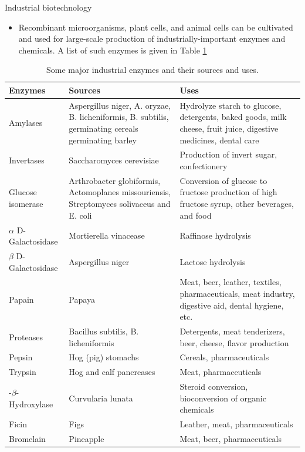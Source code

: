 \documentclass[ignorenonframetext,aspectratio=169]{beamer}
\providecommand{\tightlist}{%
  \setlength{\itemsep}{0pt}\setlength{\parskip}{0pt}}
\begin{document}
\begin{frame}{Industrial biotechnology}
\protect\hypertarget{industrial-biotechnology}{}

\begin{itemize}
\tightlist
\item
  Recombinant microorganisms, plant cells, and animal cells can be
  cultivated and used for large-scale production of
  industrially-important enzymes and chemicals. A list of such enzymes
  is given in Table \ref{tab:industrial-chemicals}
\end{itemize}

\begin{table}[t]

\caption{\label{tab:industrial-chemicals}Some major industrial enzymes and their sources and uses.}
\centering
\fontsize{5}{7}\selectfont
\begin{tabular}{>{\raggedright\arraybackslash}p{8em}>{\raggedright\arraybackslash}p{26em}>{\raggedright\arraybackslash}p{30em}}
\toprule
Enzymes & Sources & Uses\\
\midrule
\rowcolor{gray!6}  Amylases & Aspergillus niger, A. oryzae, B. licheniformis, B. subtilis, germinating cereals germinating barley & Hydrolyze starch to glucose, detergents, baked goods, milk cheese, fruit juice, digestive medicines, dental care\\
Invertases & Saccharomyces cerevisiae & Production of invert sugar, confectionery\\
\rowcolor{gray!6}  Glucose isomerase & Arthrobacter globiformis, Actomoplanes missouriensis, Streptomyces solivaceus and E. coli & Conversion of glucose to fructose production of high fructose syrup, other beverages, and food\\
$\alpha$ D-Galactosidase & Mortierella vinacease & Raffinose hydrolysis\\
\rowcolor{gray!6}  $\beta$ D-Galactosidase & Aspergillus niger & Lactose hydrolysis\\
\addlinespace
Papain & Papaya & Meat, beer, leather, textiles, pharmaceuticals, meat industry, digestive aid, dental hygiene, etc.\\
\rowcolor{gray!6}  Proteases & Bacillus subtilis, B. licheniformis & Detergents, meat tenderizers, beer, cheese, flavor production\\
Pepsin & Hog (pig) stomachs & Cereals, pharmaceuticals\\
\rowcolor{gray!6}  Trypsin & Hog and calf pancreases & Meat, pharmaceuticals\\
11-$\beta$-Hydroxylase & Curvularia lunata & Steroid conversion, bioconversion of organic chemicals\\
\addlinespace
\rowcolor{gray!6}  Ficin & Figs & Leather, meat, pharmaceuticals\\
Bromelain & Pineapple & Meat, beer, pharmaceuticals\\
\bottomrule
\end{tabular}
\end{table}

\end{frame}
\end{document}
